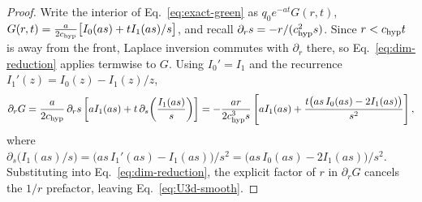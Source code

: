 \begin{proof}
Write the interior of Eq.~\eqref{eq:exact-green} as $q_0e^{-at}G(r,t)$,
$G(r,t)=\tfrac{a}{2c_{\rm hyp}}\big[I_0(as)+tI_1(as)/s\big]$, and recall
$\partial_rs=-r/(c_{\rm hyp}^2s)$. Since $r<c_{\rm hyp} t$ is away from the front,
Laplace inversion commutes with $\partial_r$ there, so
Eq.~\eqref{eq:dim-reduction} applies termwise to $G$. Using $I_0'=I_1$ and
the recurrence $I_1'(z)=I_0(z)-I_1(z)/z$,
\begin{equation}
  \partial_rG = \frac{a}{2c_{\rm hyp}}\,\partial_rs\left[aI_1(as)
    + t\,\partial_s\!\left(\frac{I_1(as)}{s}\right)\right]
  = -\frac{ar}{2c_{\rm hyp}^3s}\left[aI_1(as)
    + \frac{t\big(as\,I_0(as)-2I_1(as)\big)}{s^2}\right] ,
\end{equation}
where $\partial_s\big(I_1(as)/s\big)=\big(as\,I_1'(as)-I_1(as)\big)/s^2
=\big(as\,I_0(as)-2I_1(as)\big)/s^2$. Substituting into
Eq.~\eqref{eq:dim-reduction}, the explicit factor of $r$ in $\partial_rG$
cancels the $1/r$ prefactor, leaving Eq.~\eqref{eq:U3d-smooth}.
\end{proof}

